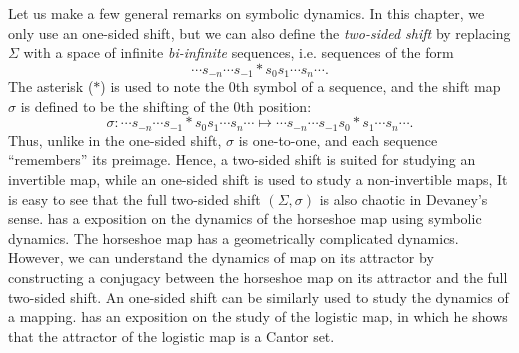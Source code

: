 \documentclass[10pt,twoside]{book}
\begin{document}
Let us make a few general remarks on symbolic dynamics.
In this chapter, we only use an one-sided shift, but we can also define the \textit{two-sided shift} by replacing $\Sigma$ with a space of infinite \textit{bi-infinite} sequences, i.e. sequences of the form 
\begin{equation*}
  \cdots s_{-n} \cdots s_{-1} * s_0 s_1 \cdots s_n \cdots.
\end{equation*}
The asterisk ($*$) is used to note the 0th symbol of a sequence, and the shift map $\sigma$ is defined to be the shifting of the 0th position:
\begin{equation*}
  \sigma: \cdots s_{-n} \cdots s_{-1} * s_0 s_1 \cdots s_n \cdots
  \mapsto
  \cdots s_{-n} \cdots s_{-1} s_0 * s_1 \cdots s_n \cdots.
\end{equation*}
Thus, unlike in the one-sided shift, $\sigma$ is one-to-one, and each sequence ``remembers'' its preimage.
Hence, a two-sided shift is suited for studying an invertible map, while an one-sided shift is used to study a non-invertible maps,
It is easy to see that the full two-sided shift $(\Sigma, \sigma)$ is also chaotic in Devaney's sense.
\citet{wiggins} has a exposition on the dynamics of the horseshoe map using symbolic dynamics.
The horseshoe map has a geometrically complicated dynamics.
However, we can understand the dynamics of map on its attractor by constructing a conjugacy between the horseshoe map on its attractor and the full two-sided shift.
An one-sided shift can be similarly used to study the dynamics of a mapping.
\citet{sternberg} has an exposition on the study of the logistic map, in which he shows that the attractor of the logistic map is a Cantor set.

\end{document}
